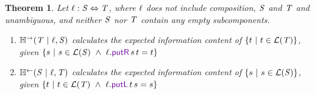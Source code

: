 \documentclass[acmsmall,screen,anonymous]{acmart}
\newtheorem*{theorem*}{Theorem}
\begin{document}
\begin{theorem*}
  Let $\mathit{\ell} : \mathit{S} \Leftrightarrow \mathit{T}$, where $\mathit{\ell}$ does not
  include composition, $\mathit{S}$ and $\mathit{T}$ and unambiguous, and neither
  $\mathit{S}$ nor $\mathit{T}$ contain any empty subcomponents.
  \begin{enumerate}
  \item $\mathbb{H}^\rightarrow(\mathit{T} ~|~ \mathit{\ell}, \mathit{S})$ calculates the expected
    information content of $\{t ~|~ t \in \mathcal{L}(\mathit{T})\}$,
    given $\SetOf{s \SuchThat s \in \LanguageOf{\Regex} \BooleanAnd
      \Lens.\PutROf{s}{t} = t}$
  \item $\mathbb{H}^\leftarrow(\mathit{S} ~|~ \mathit{\ell}, \mathit{T})$ calculates the expected
    information content of $\{s ~|~ s \in \mathcal{L}(\mathit{S})\}$,
    given $\SetOf{t \SuchThat t \in \LanguageOf{\RegexAlt} \BooleanAnd
      \Lens.\PutLOf{t}{s} = s}$
  \end{enumerate}
\end{theorem*}
\end{document}
